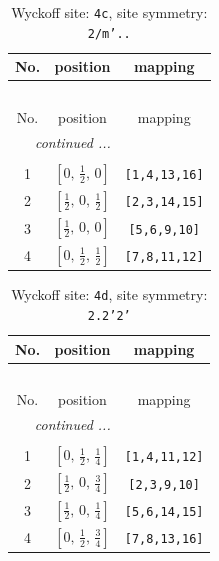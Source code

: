 \documentclass[fleqn,8pt]{jsarticle}
\begin{document}
\renewcommand{\arraystretch}{1.2}
\begin{longtable}{ccc}
\caption{Wyckoff site: {\tt 4c}, site symmetry: {\tt 2/m'..}}
 \\
 \hline \hline
No. & position & mapping \\ \hline \endfirsthead

\multicolumn{2}{l}{\tablename\ \thetable{}} \\
 \hline \hline
No. & position & mapping \\ \hline \endhead

 \hline \hline
\multicolumn{2}{r}{\footnotesize\it continued ...} \\ \endfoot

 \hline \hline
\multicolumn{2}{r}{} \\ \endlastfoot

1 & $\left[ 0,\, \frac{1}{2},\, 0 \right]$ & {\tt [1,4,13,16]} \\ \hline
2 & $\left[ \frac{1}{2},\, 0,\, \frac{1}{2} \right]$ & {\tt [2,3,14,15]} \\ \hline
3 & $\left[ \frac{1}{2},\, 0,\, 0 \right]$ & {\tt [5,6,9,10]} \\ \hline
4 & $\left[ 0,\, \frac{1}{2},\, \frac{1}{2} \right]$ & {\tt [7,8,11,12]} \\
\end{longtable}
\renewcommand{\arraystretch}{1.2}
\begin{longtable}{ccc}
\caption{Wyckoff site: {\tt 4d}, site symmetry: {\tt 2.2'2'}}
 \\
 \hline \hline
No. & position & mapping \\ \hline \endfirsthead

\multicolumn{2}{l}{\tablename\ \thetable{}} \\
 \hline \hline
No. & position & mapping \\ \hline \endhead

 \hline \hline
\multicolumn{2}{r}{\footnotesize\it continued ...} \\ \endfoot

 \hline \hline
\multicolumn{2}{r}{} \\ \endlastfoot

1 & $\left[ 0,\, \frac{1}{2},\, \frac{1}{4} \right]$ & {\tt [1,4,11,12]} \\ \hline
2 & $\left[ \frac{1}{2},\, 0,\, \frac{3}{4} \right]$ & {\tt [2,3,9,10]} \\ \hline
3 & $\left[ \frac{1}{2},\, 0,\, \frac{1}{4} \right]$ & {\tt [5,6,14,15]} \\ \hline
4 & $\left[ 0,\, \frac{1}{2},\, \frac{3}{4} \right]$ & {\tt [7,8,13,16]} \\
\end{longtable}
\end{document}
